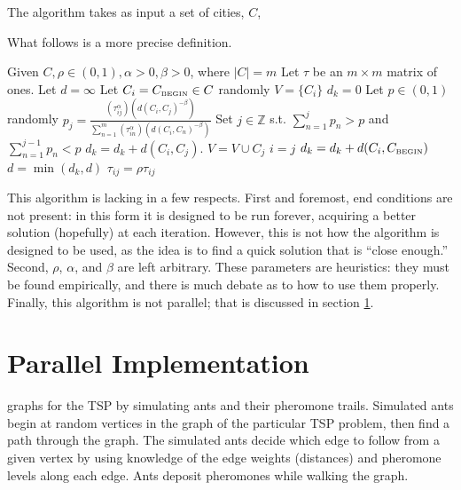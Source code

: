 \documentclass[twocolumn]{article}
\begin{document}
The algorithm takes as input a set of cities, $C$, 

What follows is a more precise definition. \\

\begin{algorithmic}
  \State Given $C, \rho \in (0,1), \alpha > 0, \beta > 0$, where $|C| = m$
  \State Let $\tau$ be an $m \times m$ matrix of ones.
  \State Let $d = \infty$
    \State Let $C_i = C_{\mbox{{\tiny BEGIN}}}\in C$ randomly
    \State $V = \{ C_i \}$
    \State $d_k = 0$
       \State Let $p \in (0,1)$ randomly
       \State $\displaystyle p_j = \frac{(\tau_{ij}^\alpha)(d(C_i,C_j)^{-\beta})}{\sum_{n=1}^m 
         (\tau_{in}^\alpha) (d(C_i,C_n)^{-\beta})}$
       \State Set $j \in \mathbb{Z}$ s.t. $\displaystyle \sum_{n=1}^j p_n > p$ and 
       $\displaystyle \sum_{n=1}^{j-1} p_n < p$
       \State $d_k = d_k + d(C_i,C_j)$.
       \State $V = V \cup C_j$
       \State $i = j$
    \EndWhile
    \State $d_k = d_k + d(C_i,C_{\mbox{{\tiny BEGIN}}})$
    \State $d = \min (d_k, d)$
    \State $\tau_{ij} = \rho \tau_{ij}$
  \EndFor \\
\end{algorithmic}

This algorithm is lacking in a few respects. First and foremost, end conditions are not present:
in this form it is designed to be run forever, acquiring a better solution (hopefully) at each
iteration. However, this is not how the algorithm is designed to be used, as the idea is to find
a quick solution that is ``close enough.'' Second, $\rho$, $\alpha$, and $\beta$ are left 
arbitrary. These parameters are heuristics: they must be found empirically, and there is much 
debate as to how to use them properly. Finally, this algorithm is not parallel; that is 
discussed in section \ref{sec:parallel}.


\section{Parallel Implementation} \label{sec:parallel}
graphs for the TSP by simulating ants and their pheromone trails. Simulated ants
begin at random vertices in the graph of the particular TSP problem, then find a
path through the graph. The simulated ants decide which edge to follow from a
given vertex by using knowledge of the edge weights (distances) and pheromone
levels along each edge. Ants deposit pheromones while walking the graph. \\
\end{document}
